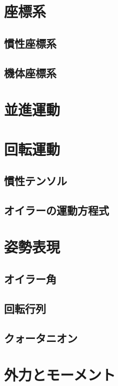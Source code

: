 \documentclass[uplatex,dvipdfmx,a4j,11pt]{jsreport}
\numberwithin{equation}{chapter}
\begin{document}
\section{座標系}

\subsection{慣性座標系}

\subsection{機体座標系}

\section{並進運動}

\section{回転運動}

\subsection{慣性テンソル}

\subsection{オイラーの運動方程式}

\section{姿勢表現}

\subsection{オイラー角}

\subsection{回転行列}

\subsection{クォータニオン}

\section{外力とモーメント}
\end{document}
